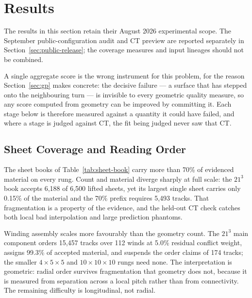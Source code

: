 \section{Results}
\label{sec:results}

The results in this section retain their August 2026 experimental scope.
The September public-configuration audit and CT preview are reported
separately in Section~\ref{sec:public-release}; the coverage measures and
input lineages should not be combined.


A single aggregate score is the wrong instrument for this problem, for the reason Section~\ref{sec:gp} makes concrete: the decisive failure --- a surface that has stepped onto the neighbouring turn --- is invisible to every geometric quality measure, so any score computed from geometry can be improved by committing it. Each stage below is therefore measured against a quantity it could have failed, and where a stage is judged against CT, the fit being judged never saw that CT.

\subsection{Sheet Coverage and Reading Order}

The sheet books of Table~\ref{tab:sheet-book} carry more than 70\% of evidenced material on every rung. Count and material diverge sharply at full scale: the $21^3$ book accepts 6,188 of 6,500 lifted sheets, yet its largest single sheet carries only 0.15\% of the material and the 70\% prefix requires 5,493 tracks. That fragmentation is a property of the evidence, and the held-out CT check catches both local bad interpolation and large prediction phantoms.

Winding assembly scales more favourably than the geometry count. The $21^3$ main component orders 15,457 tracks over 112 winds at 5.0\% residual conflict weight, assigns 99.3\% of accepted material, and suspends the order claims of 174 tracks; the smaller $4\times5\times5$ and $10\times10\times10$ rungs need none. The interpretation is geometric: radial order survives fragmentation that geometry does not, because it is measured from separation across a local pitch rather than from connectivity. The remaining difficulty is longitudinal, not radial.

